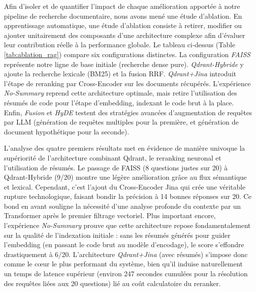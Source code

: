 Afin d'isoler et de quantifier l'impact de chaque amélioration apportée à notre pipeline de recherche documentaire, nous avons mené une étude d'ablation. En apprentissage automatique, une étude d'ablation consiste à retirer, modifier ou ajouter unitairement des composants d'une architecture complexe afin d'évaluer leur contribution réelle à la performance globale. Le tableau ci-dessus (Table \ref{tab:ablation_rag}) compare six configurations distinctes. La configuration \textit{FAISS} représente notre ligne de base initiale (recherche dense pure). \textit{Qdrant-Hybride} y ajoute la recherche lexicale (BM25) et la fusion RRF. \textit{Qdrant+Jina} introduit l'étape de reranking par Cross-Encoder sur les documents récupérés. L'expérience \textit{No-Summary} reprend cette architecture optimale, mais retire l'utilisation des résumés de code pour l'étape d'embedding, indexant le code brut à la place. Enfin, \textit{Fusion} et \textit{HyDE} testent des stratégies avancées d'augmentation de requêtes par LLM (génération de requêtes multiples pour la première, et génération de document hypothétique pour la seconde).

L'analyse des quatre premiers résultats met en évidence de manière univoque la supériorité de l'architecture combinant Qdrant, le reranking neuronal et l'utilisation de résumés. Le passage de FAISS (8 questions justes sur 20) à Qdrant-Hybride (9/20) montre une légère amélioration grâce au flux sémantique et lexical. Cependant, c'est l'ajout du Cross-Encoder Jina qui crée une véritable rupture technologique, faisant bondir la précision à 14 bonnes réponses sur 20. Ce bond en avant souligne la nécessité d'une analyse profonde du contexte par un Transformer après le premier filtrage vectoriel. Plus important encore, l'expérience \textit{No-Summary} prouve que cette architecture repose fondamentalement sur la qualité de l'indexation initiale : sans les résumés générés pour guider l'embedding (en passant le code brut au modèle d'encodage), le score s'effondre drastiquement à 6/20. L'architecture \textit{Qdrant+Jina} (avec résumés) s'impose donc comme le cœur le plus performant du système, bien qu'il induise naturellement un temps de latence supérieur (environ 247 secondes cumulées pour la résolution des requêtes liées aux 20 questions) lié au coût calculatoire du reranker.


